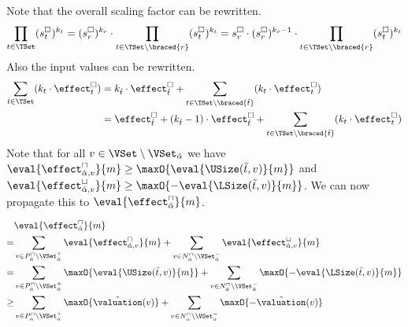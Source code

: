 Note that the overall scaling factor can be rewritten.
\begin{equation} \label{eq:scaling_factor_reduction}
  \prod_{t \in \TSet} (s^\square_t)^{k_t} = (s^\square_r)^{k_r} \cdot \prod_{t \in \TSet \setminus \braced{r}} (s^\square_t)^{k_t} = s^\square_r \cdot (s^\square_r)^{k_r - 1} \cdot \prod_{t \in \TSet \setminus \braced{r}} (s^\square_t)^{k_t}
\end{equation}
Also the input values can be rewritten.
\begin{equation} \label{eq:input_reduction}
  \begin{split}
  \sum_{t \in \TSet} (k_t \cdot \effect^\square_t)
  & = k_{\hat{t}} \cdot \effect^\square_{\hat{t}} + \sum_{t \in \TSet \setminus \braced{\hat{t}}} (k_t \cdot \effect^\square_t) \\
  & = \effect^\square_{\hat{t}}
    + (k_{\hat{t}} - 1) \cdot \effect^\square_{\hat{t}}
    + \sum_{t \in \TSet \setminus \braced{\hat{t}}} (k_t \cdot \effect^\square_t)
  \end{split}
\end{equation}
Note that for all $v \in \VSet \setminus \VSet_{\hat{\alpha}}$ we have $\eval{\effect^\sqcap_{\hat{\alpha},v}}{m} \geq \maxO{\eval{\USize(\tilde{t}, v)}{m}}$ and $\eval{\effect^\sqcup_{\hat{\alpha},v}}{m} \geq \maxO{-\eval{\LSize(\tilde{t}, v)}{m}}$.
We can now propagate this to $\eval{\effect^\sqcap_{\hat{\alpha}}}{m}$.

\begin{equation} \label{eq:input_rv_reduction_upper}
  \begin{split}
  & \eval{\effect^\sqcap_{\hat{\alpha}}}{m} \\
  = & \sum_{v \in P_{\hat{\alpha}}^\sqcap \setminus \VSet^+_{\hat{\alpha}}} \eval{\effect^\sqcap_{{\hat{\alpha}},v}}{m}
    + \sum_{v \in N_{\hat{\alpha}}^\sqcap \setminus \VSet^-_{\hat{\alpha}}} \eval{\effect^\sqcup_{{\hat{\alpha}},v}}{m} \\
  = & \sum_{v \in P_{\hat{\alpha}}^\sqcap \setminus \VSet^+_{\hat{\alpha}}} \maxO{\eval{\USize(\tilde{t}, v)}{m}}
    + \sum_{v \in N_{\hat{\alpha}}^\sqcap \setminus \VSet^-_{\hat{\alpha}}} \maxO{-\eval{\LSize(\tilde{t}, v)}{m}} \\
  \geq & \sum_{v \in P_{\hat{\alpha}}^\sqcap \setminus \VSet^+_{\hat{\alpha}}} \maxO{\tilde{\valuation}(v)}
    + \sum_{v \in N_{\hat{\alpha}}^\sqcap \setminus \VSet^-_{\hat{\alpha}}} \maxO{-\tilde{\valuation}(v)} \\
  \end{split}
\end{equation}

